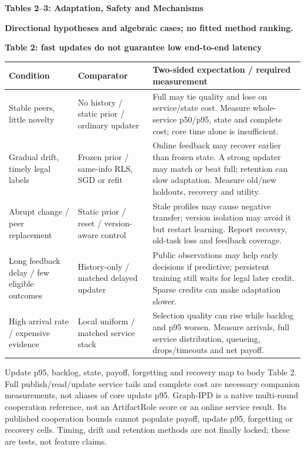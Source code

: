 \documentclass[10pt,a4paper]{article}
\newcommand{\lead}[1]{\vspace{4pt}\textbf{#1}\par}
\newcommand{\caution}{\textcolor{red!70!black}{\textbf{Directional hypotheses and algebraic cases; no fitted method ranking.}}\par}
\begin{document}
\clearpage
{\large\bfseries Tables 2--3: Adaptation, Safety and Mechanisms}\par\caution
\lead{Table 2: fast updates do not guarantee low end-to-end latency}
\begin{center}\small
\begin{tabularx}{\linewidth}{@{}L{.20\linewidth}L{.23\linewidth}X@{}}\toprule
Condition & Comparator & Two-sided expectation / required measurement\\\midrule
Stable peers, little novelty & No history / static prior / ordinary updater & Full may tie quality and lose on service/state cost. Measure whole-service p50/p95, state and complete cost; core time alone is insufficient.\\
Gradual drift, timely legal labels & Frozen prior / same-info RLS, SGD or refit & Online feedback may recover earlier than frozen state. A strong updater may match or beat full; retention can slow adaptation. Measure old/new holdouts, recovery and utility.\\
Abrupt change / peer replacement & Static prior / reset / version-aware control & Stale profiles may cause negative transfer; version isolation may avoid it but restart learning. Report recovery, old-task loss and feedback coverage.\\
Long feedback delay / few eligible outcomes & History-only / matched delayed updater & Public observations may help early decisions if predictive; persistent training still waits for legal later credit. Sparse credits can make adaptation slower.\\
High arrival rate / expensive evidence & Local uniform / matched service stack & Selection quality can rise while backlog and p95 worsen. Measure arrivals, full service distribution, queueing, drops/timeouts and net payoff.\\\bottomrule
\end{tabularx}\end{center}
Update p95, backlog, state, payoff, forgetting and recovery map to body Table 2.
Full publish/read/update service tails and complete cost are necessary companion
measurements, not aliases of core update p95.
Graph-IPD is a native multi-round cooperation reference, not an ArtifactRole
score or an online service result. Its published cooperation bounds cannot
populate payoff, update p95, forgetting or recovery cells. Timing, drift and
retention methods are not finally locked; these are tests, not feature claims.
\end{document}
